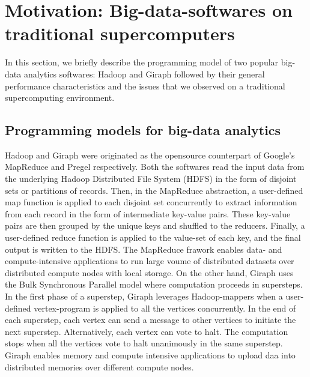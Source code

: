 \documentclass[conference]{IEEEtran}
\begin{document}
\section {Motivation: Big-data-softwares on traditional supercomputers} \label{Bigdata Softwares on Traditional Supercomputers}
In this section, we briefly describe the programming model of two popular big-data analytics softwares: Hadoop and Giraph followed by their general performance characteristics and the issues that we observed on a traditional supercomputing environment. 
\subsection {Programming models for big-data analytics}
Hadoop and Giraph were originated as the opensource counterpart of Google's MapReduce \cite{fw:mapreduce} and Pregel \cite{fw:pregel} respectively. 
Both the softwares read the input data  from the underlying Hadoop Distributed File System (HDFS) in the form of disjoint sets or partitions of records. 
Then, in the MapReduce abstraction, a user-defined map function is applied to each disjoint set concurrently to extract information from each record in the form of intermediate key-value pairs. 
These key-value pairs are then grouped by the unique keys and shuffled to the reducers. 
Finally, a user-defined reduce function is applied to the value-set of each key, and the final output is written to the HDFS. 
The MapReduce frawork enables data- and compute-intensive applications to run large voume of distributed datasets over distributed compute nodes with local storage.
On the other hand, Giraph uses the Bulk Synchronous Parallel model \cite{fw:bsp} where computation proceeds in supersteps. 
In the first phase of a superstep, Giraph leverages Hadoop-mappers when a user-defined vertex-program is applied to all the vertices concurrently.
In the end of each superstep, each vertex can send a message to other vertices to initiate the next superstep. 
Alternatively, each vertex can vote to halt. 
The computation stops when all the vertices vote to halt unanimously in the same superstep. 
Giraph enables memory and compute intensive applications to upload daa into distributed memories over different compute nodes.

 
\end{document}
